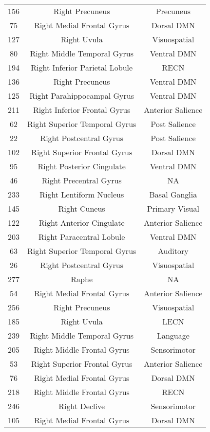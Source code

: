 \documentclass[10pt,letterpaper]{article}\usepackage[]{graphicx}\usepackage[]{color}
\begin{document}
\begin{center}
\begin{longtable}[c]{ccc}
		156	& Right Precuneus & Precuneus \\
		75 & Right Medial Frontal Gyrus	& Dorsal DMN \\
		127	& Right Uvula & Visuospatial \\
		80 & Right Middle Temporal Gyrus & Ventral DMN \\
		194	& Right Inferior Parietal Lobule & RECN \\
		136	& Right Precuneus & Ventral DMN \\
		125	& Right Parahippocampal Gyrus & Ventral DMN \\
		211	& Right Inferior Frontal Gyrus & Anterior Salience \\
		62 & Right Superior Temporal Gyrus & Post Salience \\
		22 & Right Postcentral Gyrus & Post Salience \\
		102	& Right Superior Frontal Gyrus & Dorsal DMN \\
		95 & Right Posterior Cingulate & Ventral DMN \\
		46 & Right Precentral Gyrus	& NA \\
		233	& Right Lentiform Nucleus & Basal Ganglia \\
		145	& Right Cuneus & Primary Visual \\
		122	& Right Anterior Cingulate & Anterior Salience \\
		203	& Right Paracentral Lobule & Ventral DMN \\
		63 & Right Superior Temporal Gyrus & Auditory \\
		26 & Right Postcentral Gyrus & Visuospatial \\
		277	& Raphe	& NA \\
		54 & Right Medial Frontal Gyrus	& Anterior Salience \\
		256	& Right Precuneus & Visuospatial \\
		185	& Right Uvula & LECN \\
		239	& Right Middle Temporal Gyrus & Language \\
		205	& Right Middle Frontal Gyrus & Sensorimotor \\
		53 & Right Superior Frontal Gyrus & Anterior Salience \\
		76 & Right Medial Frontal Gyrus	& Dorsal DMN \\
		218	& Right Middle Frontal Gyrus & RECN \\
		246	& Right Declive	& Sensorimotor \\
		105	& Right Medial Frontal Gyrus & Dorsal DMN \\

\end{longtable}
\end{center}
\end{document}
